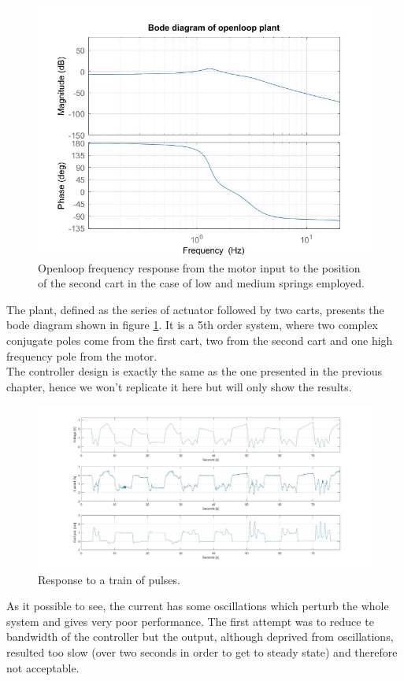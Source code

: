 \begin{figure}[h]
\centering
\includegraphics[width=0.5\linewidth]{img/bode_ol}
\caption{Openloop frequency response from the motor input to the position of the second cart in the case of low and medium springs employed.}
\label{fig:bodeol}
\end{figure}

The plant, defined as the series of actuator followed by two carts, presents the bode diagram shown in figure \ref{fig:bodeol}. It is a 5th order system, where two complex conjugate poles come from the first cart, two from the second cart and one high frequency pole from the motor.\\

The controller design is exactly the same as the one presented in the previous chapter, hence we won't replicate it here but will only show the results.\\


\begin{figure}[h]
\centering
\includegraphics[width=0.9\linewidth]{img/hinf_nocurr}
\caption{Response to a train of pulses.}
\label{fig:hinfnocurr}
\end{figure}

As it possible to see, the current has some oscillations which perturb the whole system and gives very poor performance. The first attempt was to reduce te bandwidth of the controller but the output, although deprived from oscillations, resulted too slow (over two seconds in order to get to steady state) and therefore not acceptable.\\


